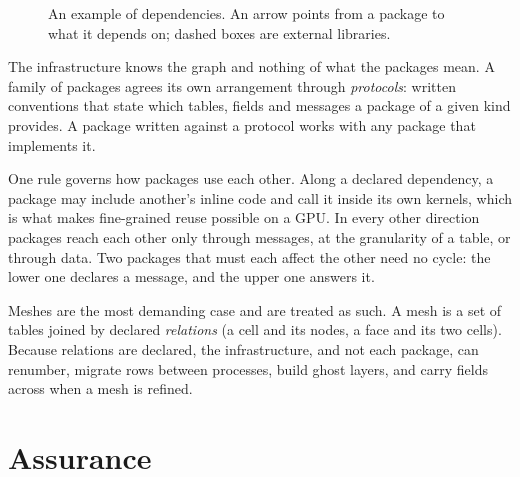 \documentclass[11pt,a4paper]{article}
\newcommand{\camshaft}{\textsc{camshaft}}
\begin{document}
\begin{figure}[ht]
\centering
{}
\caption{An example of dependencies.  An arrow points from a package to
what it depends on; dashed boxes are external libraries.}
\label{fig:packages}
\end{figure}

The infrastructure knows the graph and nothing of what the packages mean.
A family of packages agrees its own arrangement through \emph{protocols}:
written conventions that state which tables, fields and messages a package
of a given kind provides.  A package written against a protocol works with
any package that implements it.

One rule governs how packages use each other.  Along a declared dependency,
a package may include another's inline code and call it inside its own
kernels, which is what makes fine-grained reuse possible on a GPU.  In
every other direction packages reach each other only through messages, at
the granularity of a table, or through data.  Two packages that must each
affect the other need no cycle: the lower one declares a message, and the
upper one answers it.

Meshes are the most demanding case and are treated as such.  A mesh is a
set of tables joined by declared \emph{relations} (a cell and its nodes, a
face and its two cells).  Because relations are declared, the
infrastructure, and not each package, can renumber, migrate rows between
processes, build ghost layers, and carry fields across when a mesh is
refined.

\section{Assurance}
\end{document}

